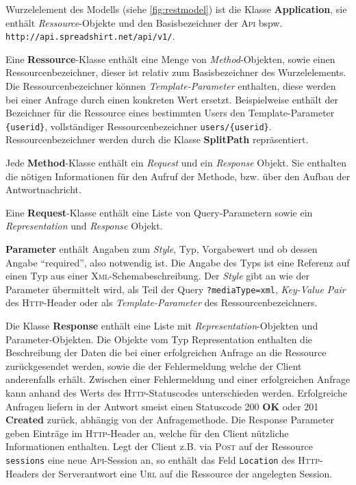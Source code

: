 Wurzelelement des Modells (siehe \cref{fig:restmodel}) ist die Klasse \textbf{Application}, sie enthält \emph{Ressource}-Objekte und den Basisbezeichner der \textsc{Api} bspw. \texttt{\small http://api.spreadshirt.net/api/v1/}. 

Eine \textbf{Ressource}-Klasse enthält eine Menge von \emph{Method}-Objekten, sowie einen Ressourcenbezeichner, dieser ist relativ zum Basisbezeichner des Wurzelelements. Die Ressourcenbezeichner können \emph{Template-Parameter} enthalten, diese werden bei einer Anfrage durch einen konkreten Wert ersetzt. Beispielweise enthält der Bezeichner für die Ressource eines bestimmten Users den Template-Parameter \texttt{\{userid\}}, vollständiger Ressourcenbezeichner \texttt{users/\{userid\}}. Ressourcenbezeichner werden durch die Klasse \textbf{SplitPath} repräsentiert. 

Jede \textbf{Method}-Klasse enthält ein \emph{Request} und ein \emph{Response} Objekt. Sie enthalten die nötigen Informationen für den Aufruf der Methode, bzw. über den Aufbau der Antwortnachricht.

Eine \textbf{Request}-Klasse enthält eine Liste von Query-Parametern sowie ein \emph{Representation} und \emph{Response} Objekt.

\textbf{Parameter} enthält Angaben zum \emph{Style}, Typ, Vorgabewert und ob dessen Angabe \enquote{required}, also notwendig ist. Die Angabe des Typs ist eine Referenz auf einen Typ aus einer \textsc{Xml}-Schemabeschreibung. Der \emph{Style} gibt an wie der Parameter übermittelt wird, als Teil der Query \texttt{?mediaType=xml}, \emph{Key-Value Pair} des \textsc{Http}-Header oder als \emph{Template-Parameter} des Ressourcenbezeichners. 

Die Klasse \textbf{Response} enthält eine Liste mit \emph{Representation}-Objekten und Parameter-Objekten. Die Objekte vom Typ Representation enthalten die Beschreibung der Daten die bei einer erfolgreichen Anfrage an die Ressource zurückgesendet werden, sowie die der Fehlermeldung welche der Client anderenfalls erhält. Zwischen einer Fehlermeldung und einer erfolgreichen Anfrage kann anhand des Werts des \textsc{Http}-Statuscodes unterschieden werden. Erfolgreiche Anfragen liefern in der Antwort smeist einen Statuscode 200 \textbf{OK} oder 201 \textbf{Created} zurück, abhängig von der Anfragemethode. Die Response Parameter geben Einträge im \textsc{Http}-Header an, welche für den Client nützliche Informationen enthalten. Legt der Client z.B. via \textsc{Post} auf der Ressource \texttt{sessions} eine neue \textsc{Api}-Session an, so enthält das Feld \texttt{Location} des \textsc{Http}-Headers der Serverantwort eine \textsc{Url} auf die Ressource der angelegten Session.

